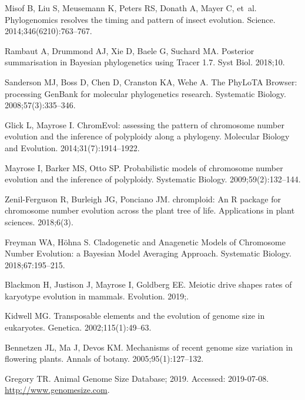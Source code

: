 \documentclass[]{rsos}%
\begin{document}
\begin{thebibliography}{99}
Misof B, Liu S, Meusemann K, Peters RS, Donath A, Mayer C, et~al.
 Phylogenomics resolves the timing and pattern of insect evolution.
 Science. 2014;346(6210):763--767.

Rambaut A, Drummond AJ, Xie D, Baele G, Suchard MA.
 Posterior summarisation in Bayesian phylogenetics using Tracer 1.7.
 Syst Biol. 2018;10.

Sanderson MJ, Boss D, Chen D, Cranston KA, Wehe A.
 The PhyLoTA Browser: processing GenBank for molecular phylogenetics
  research.
 Systematic Biology. 2008;57(3):335--346.


Glick L, Mayrose I.
 ChromEvol: assessing the pattern of chromosome number evolution and
  the inference of polyploidy along a phylogeny.
 Molecular Biology and Evolution. 2014;31(7):1914--1922.

Mayrose I, Barker MS, Otto SP.
 Probabilistic models of chromosome number evolution and the inference
  of polyploidy.
 Systematic Biology. 2009;59(2):132--144.

Zenil-Ferguson R, Burleigh JG, Ponciano JM.
 chromploid: An R package for chromosome number evolution across the
  plant tree of life.
 Applications in plant sciences. 2018;6(3).
 
Freyman WA, H{\"o}hna S.
 Cladogenetic and Anagenetic Models of Chromosome Number Evolution: a
  {B}ayesian Model Averaging Approach.
 Systematic Biology. 2018;67:195--215.

Blackmon H, Justison J, Mayrose I, Goldberg EE.
 Meiotic drive shapes rates of karyotype evolution in mammals.
 Evolution. 2019;.

Kidwell MG.
 Transposable elements and the evolution of genome size in eukaryotes.
 Genetica. 2002;115(1):49--63.

Bennetzen JL, Ma J, Devos KM.
 Mechanisms of recent genome size variation in flowering plants.
 Annals of botany. 2005;95(1):127--132.

Gregory TR. Animal Genome Size Database; 2019.
 Accessed: 2019-07-08.
 \url{http://www.genomesize.com}.
 

\end{thebibliography}
\end{document}
